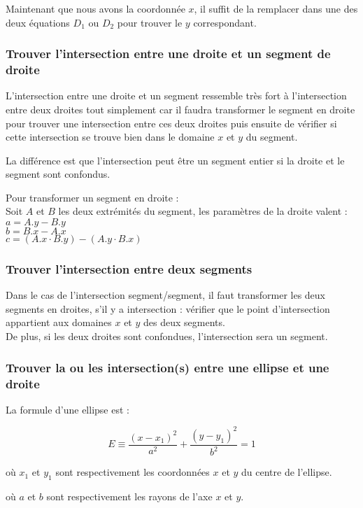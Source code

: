 \documentclass[]{report}
\begin{document}
Maintenant que nous avons la coordonnée $x$, il suffit de la remplacer
dans une des deux équations $D_1$ ou $D_2$ pour trouver le $y$ 
correspondant.

\subsubsection{Trouver l'intersection entre une droite et un segment de droite}

L'intersection entre une droite et un segment ressemble très fort
à l'intersection entre deux droites tout simplement car il faudra transformer
le segment en droite pour trouver une intersection entre ces deux droites
puis ensuite de vérifier si cette intersection se trouve bien dans le domaine
$x$ et $y$ du segment.

La différence est que l'intersection peut être un segment entier si la droite
et le segment sont confondus.

Pour transformer un segment en droite : \\
Soit $A$ et $B$ les deux extrémités du segment, les paramètres de la droite valent : 
$ a = A.y - B.y $ \\
$ b = B.x - A.x $ \\
$ c = (A.x \cdot B.y) - (A.y \cdot B.x) $ \\

\subsubsection{Trouver l'intersection entre deux segments}

Dans le cas de l'intersection segment/segment, il faut transformer les
deux segments en droites, s'il y a intersection : vérifier que le point
d'intersection appartient aux domaines $x$ et $y$ des deux segments. \\
De plus, si les deux droites sont confondues, l'intersection sera un segment.

\subsubsection{Trouver la ou les intersection(s) entre une ellipse et une droite}

La formule d'une ellipse est : 

$$ E \equiv \frac{(x - x_1)^2}{a^2} + \frac{(y - y_1)^2}{b^2} = 1 $$

\begin{description}
\item où $x_1$ et $y_1$ sont respectivement les coordonnées
$x$ et $y$ du centre de l'ellipse. 
\item où $a$ et $b$ sont respectivement les rayons de l'axe
$x$ et $y$. \\
\end{description}
\end{document}

